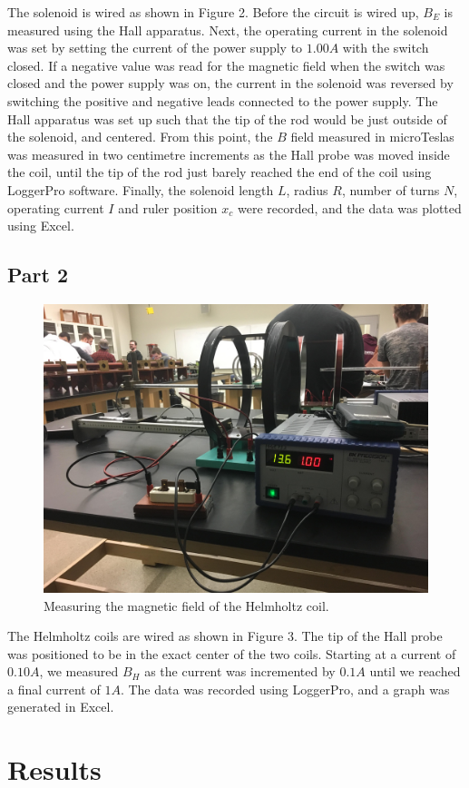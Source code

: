 \documentclass[letterpaper]{article}
\begin{document}
The solenoid is wired as shown in Figure 2. Before the circuit is wired up,
$B_E$ is measured using the Hall apparatus. Next, the operating current in the solenoid
was set by setting the current of the power supply to $1.00 A$ with the switch closed.
If a negative value was read for the magnetic field when the switch was
closed and the power supply was on, the current in the solenoid was reversed by switching the
positive and negative leads connected to the power supply. The Hall apparatus
was set up such that the tip of the rod would be just outside of the solenoid,
and centered. From this point, the $B$ field measured in microTeslas was measured
in two centimetre increments as the Hall probe was moved inside the coil, until the
tip of the rod just barely reached the end of the coil using LoggerPro software.
Finally, the solenoid length $L$, radius $R$, number of turns $N$, operating current $I$
and ruler position $x_c$ were recorded, and the data was plotted using Excel.

\subsection{Part 2}

\begin{figure}[H]
    \centering
    \includegraphics[width=.6\textwidth]{p2-3.jpg}
    \caption{Measuring the magnetic field of the Helmholtz coil.}
\end{figure}
The Helmholtz coils are wired as shown in Figure 3. The tip of the Hall probe
was positioned to be in the exact center of the two coils. Starting at a current
of $0.10 A$, we measured $B_H$ as the current was incremented by $0.1 A$ until
we reached a final current of $1A$. The data was recorded using LoggerPro, and
a graph was generated in Excel.


\section{Results}
\end{document}
